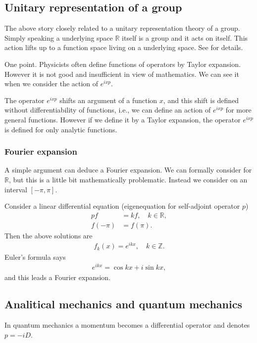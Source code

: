 \documentclass[openany, a4paper, oneside]{jsbook}
\theoremstyle{break}
\theoremstyle{breakdefn}
\newcommand{\bbR}{\mathbb{R}}
\newcommand{\bbZ}{\mathbb{Z}}
\begin{document}
\subsection{Unitary representation of a group}


The above story closely related to a unitary representation theory of a group.
Simply speaking a underlying space $\bbR$ itself is a group
and it acts on itself.
This action lifts up to a function space living on a underlying space.
See \cite{KobayashiOshima1} for details.

One point.
Physicists often define functions of operators by Taylor expansion.
However it is not good and insufficient in view of mathematics.
We can see it when we consider the action of $e^{ixp}$.

The operator $e^{i x p}$ shifts an argument of a function $x$,
and this shift is defined without differentiability of functions,
i.e., we can define an action of $e^{ixp}$ for more general functions.
However if we define it by a Taylor expansion,
the operator $e^{ixp}$ is defined for only analytic functions.
\subsubsection{Fourier expansion}


A simple argument can deduce a Fourier expansion.
We can formally consider for $\bbR$,
but this is a little bit mathematically problematic.
Instead we consider on an interval $[ - \pi, \pi]$.

Consider a linear differential equation (eigenequation for
self-adjoint operator $p$)
\begin{align}
 p f
 &=
 k f, \quad k \in \bbR, \\
 f(-\pi)
 &=
 f(\pi).
\end{align}
Then the above solutions are
\begin{align}
 f_k(x)
 =
 e^{ikx}, \quad
 k \in \bbZ.
\end{align}
Euler's formula says
\begin{align}
 e^{ikx}
 =
 \cos kx + i \sin kx,
\end{align}
and this leads a Fourier expansion.
\subsection{Analitical mechanics and quantum mechanics}


In quantum mechanics a momentum becomes a differential operator
and denotes $p = -i D$.
\end{document}
